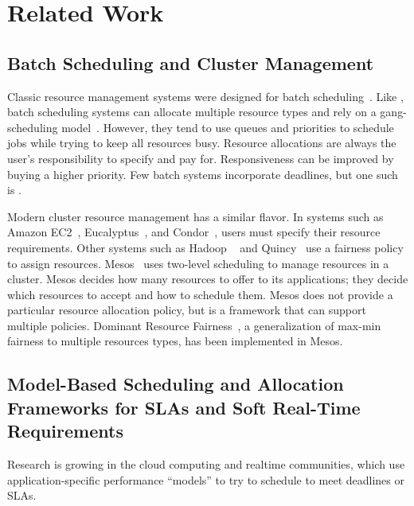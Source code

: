 \chapter{Related Work}
\section{Batch Scheduling and Cluster Management}
Classic resource management systems were designed for batch scheduling~\cite{Feit97,FRS04}. Like \pacora, batch scheduling systems can allocate multiple resource types and rely on a gang-scheduling model~\cite{FeRu92}.  However, they tend to use queues and priorities to schedule jobs while trying to keep all resources busy. Resource allocations are always the user's responsibility to specify and pay for. Responsiveness can be improved by buying a higher priority. Few batch systems incorporate deadlines, but one such is \cite{AKKMS95}.

Modern cluster resource management has a similar flavor.  In systems such as
Amazon EC2~\cite{EC2}, Eucalyptus~\cite{eucalyptus}, and Condor~\cite{Condor}, users must specify their resource requirements.  Other systems such as Hadoop ~\cite{hadoop_fair, hadoop_cap, hadoop_matei} and Quincy~\cite{Quincy} use a fairness policy to assign resources. Mesos~\cite{mesos} uses two-level scheduling to manage resources in a cluster. Mesos decides how many resources to offer to its applications; they decide which resources to accept and how to schedule them. Mesos does not provide a particular resource allocation policy, but is a framework that can support multiple policies. Dominant Resource Fairness~\cite{mesos-DRF}, a generalization of max-min fairness to multiple resources types, has been implemented in Mesos.

\section{Model-Based Scheduling and Allocation Frameworks for SLAs and Soft Real-Time Requirements}

Research is growing in the cloud computing and realtime communities, which use application-specific performance ``models'' to try to schedule to meet deadlines or SLAs.

